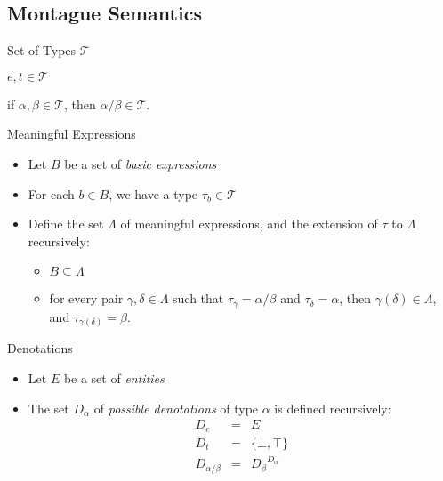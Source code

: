 \documentclass{beamer}
\newlength{\wideitemsep}
\let\olditem\item
\renewcommand{\item}{\setlength{\itemsep}{\wideitemsep}\olditem}
\begin{document}
\subsection{Montague Semantics}

\begin{frame}{Set of Types $\mathcal{T}$}
\begin{description}
\item [Basic types:] $e,t\in \mathcal{T}$
\item[Complex types:]  if $\alpha, \beta\in \mathcal{T}$, then $\alpha/\beta\in \mathcal{T}$.
\end{description}
\end{frame}

\begin{frame}{Meaningful Expressions}
\begin{itemize}
\item Let $B$ be a set of \emph{basic expressions}
\item For each $b\in B$, we have a type $\tau_b\in \mathcal{T}$
\item Define the set $\Lambda$ of meaningful expressions, and the extension of $\tau$ to $\Lambda$ recursively:
\begin{itemize}
\item $B\subseteq \Lambda$
\item for every pair $\gamma,\delta\in \Lambda$ such that $\tau_\gamma
  = \alpha/\beta$ and $\tau_\delta = \alpha$, then $\gamma(\delta)\in
  \Lambda$, and $\tau_{\gamma(\delta)} = \beta$.
\end{itemize}
\end{itemize}
\end{frame}

\begin{frame}{Denotations}
\begin{itemize}
\item Let $E$ be a set of \emph{entities}
\item The set $D_\alpha$ of \emph{possible denotations} of type $\alpha$ is
defined recursively:
\begin{eqnarray*}
D_e &=& E\\
D_t &=& \{\bot,\top\}\\
D_{\alpha/\beta} &=& {D_\beta}^{D_\alpha}
\end{eqnarray*}
\end{itemize}
\end{frame}
\end{document}
